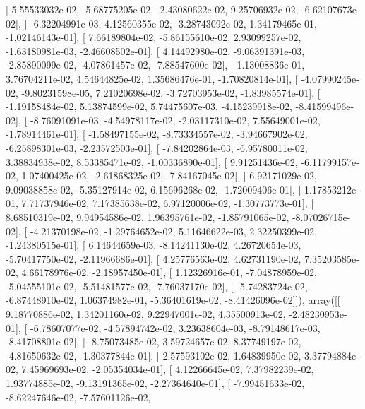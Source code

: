 \documentclass{article}
\begin{document}
       [  5.55533032e-02,  -5.68775205e-02,  -2.43080622e-02,
          9.25706932e-02,  -6.62107673e-02],
       [ -6.32204991e-03,   4.12560355e-02,  -3.28743092e-02,
          1.34179465e-01,  -1.02146143e-01],
       [  7.66189804e-02,  -5.86155610e-02,   2.93099257e-02,
         -1.63180981e-03,  -2.46608502e-01],
       [  4.14492980e-02,  -9.06391391e-03,  -2.85890099e-02,
         -4.07861457e-02,  -7.88547600e-02],
       [  1.13008836e-01,   3.76704211e-02,   4.54644825e-02,
          1.35686476e-01,  -1.70820814e-01],
       [ -4.07990245e-02,  -9.80231598e-05,   7.21020698e-02,
         -3.72703953e-02,  -1.83985574e-01],
       [ -1.19158484e-02,   5.13874599e-02,   5.74475607e-03,
         -4.15239918e-02,  -8.41599496e-02],
       [ -8.76091091e-03,  -4.54978117e-02,  -2.03117310e-02,
          7.55649001e-02,  -1.78914461e-01],
       [ -1.58497155e-02,  -8.73334557e-02,  -3.94667902e-02,
         -6.25898301e-03,  -2.23572503e-01],
       [ -7.84202864e-03,  -6.95780011e-02,   3.38834938e-02,
          8.53385471e-02,  -1.00336890e-01],
       [  9.91251436e-02,  -6.11799157e-02,   1.07400425e-02,
         -2.61868325e-02,  -7.84167045e-02],
       [  6.92171029e-02,   9.09038858e-02,  -5.35127914e-02,
          6.15696268e-02,  -1.72009406e-01],
       [  1.17853212e-01,   7.71737946e-02,   7.17385638e-02,
          6.97120006e-02,  -1.30773773e-01],
       [  8.68510319e-02,   9.94954586e-02,   1.96395761e-02,
         -1.85791065e-02,  -8.07026715e-02],
       [ -4.21370198e-02,  -1.29764652e-02,   5.11646622e-03,
          2.32250399e-02,  -1.24380515e-01],
       [  6.14644659e-03,  -8.14241130e-02,   4.26720654e-03,
         -5.70417750e-02,  -2.11966686e-01],
       [  4.25776563e-02,   4.62731190e-02,   7.35203585e-02,
          4.66178976e-02,  -2.18957450e-01],
       [  1.12326916e-01,  -7.04878959e-02,  -5.04555101e-02,
         -5.51481577e-02,  -7.76037170e-02],
       [ -5.74283724e-02,  -6.87448910e-02,   1.06374982e-01,
         -5.36401619e-02,  -8.41426096e-02]]), array([[  9.18770886e-02,   1.34201160e-02,   9.22947001e-02,
          4.35500913e-02,  -2.48230953e-01],
       [ -6.78607077e-02,  -4.57894742e-02,   3.23638604e-03,
         -8.79148617e-03,  -8.41708801e-02],
       [ -8.75073485e-02,   3.59724657e-02,   8.37749197e-02,
         -4.81650632e-02,  -1.30377844e-01],
       [  2.57593102e-02,   1.64839950e-02,   3.37794884e-02,
          7.45969693e-02,  -2.05354034e-01],
       [  4.12266645e-02,   7.37982239e-02,   1.93774885e-02,
         -9.13191365e-02,  -2.27364640e-01],
       [ -7.99451633e-02,  -8.62247646e-02,  -7.57601126e-02,
\end{document}
